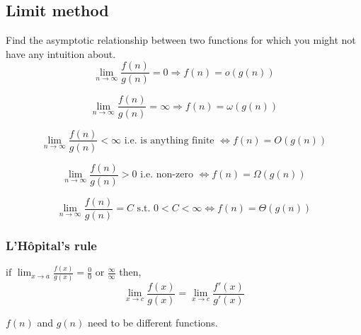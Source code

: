 \subsection{Limit method}
    \begin{definition}
        Find the asymptotic relationship between two functions for which you might not have any intuition about. 
        \begin{equation}
            \lim_{n \to \infty} \frac{f(n)}{g(n)} = 0 \Rightarrow f(n) = o(g(n))
        \end{equation}
        
        \begin{equation}
            \lim_{n \to \infty} \frac{f(n)}{g(n)} = \infty \Rightarrow f(n) = \omega(g(n))
        \end{equation}
        
        \begin{equation}
            \lim_{n \to \infty} \frac{f(n)}{g(n)} < \infty \text{ i.e. is anything finite } \Leftrightarrow f(n) = O(g(n))
        \end{equation}
        
        \begin{equation}
            \lim_{n \to \infty} \frac{f(n)}{g(n)} > 0 \text{ i.e. non-zero } \Leftrightarrow f(n) = \Omega(g(n))
        \end{equation}
        
        \begin{equation}
            \lim_{n \to \infty} \frac{f(n)}{g(n)} = C \text{ s.t. } 0 < C < \infty \Leftrightarrow f(n) = \Theta(g(n))
        \end{equation}        
    \end{definition}

    \subsubsection{L'Hôpital's rule}
    \begin{definition}
        $\text{if } \lim_{x \to a} \frac{f(x)}{g(x)} = \frac{0}{0} \text{ or } \frac{\infty}{\infty}$ then,
        \begin{equation}
            \lim_{x \to c} \frac{f(x)}{g(x)} = \lim_{x \to c} \frac{f'(x)}{g'(x)}
        \end{equation}
        
    \end{definition}

    \begin{warning}
        $f(n)$ and $g(n)$ need to be different functions. 
    \end{warning}

